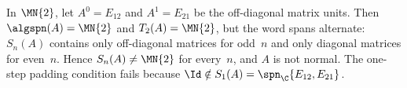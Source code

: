 \begin{remark}%
    \label{rem:cumspan_counterexample}\leanok
    In $\MN{2}$, let $A^0=E_{12}$ and $A^1=E_{21}$ be the off-diagonal
    matrix units.
    Then $\algspn(A)=\MN{2}$ and $T_2(A)=\MN{2}$, but the word spans
    alternate: $S_n(A)$ contains only off-diagonal matrices for odd~$n$
    and only diagonal matrices for even~$n$.
    Hence $S_n(A)\neq\MN{2}$ for every~$n$, and $A$ is not normal.
    The one-step padding condition fails because
    $\Id\notin S_1(A)=\spn_{\C}\{E_{12},E_{21}\}$.
\end{remark}
